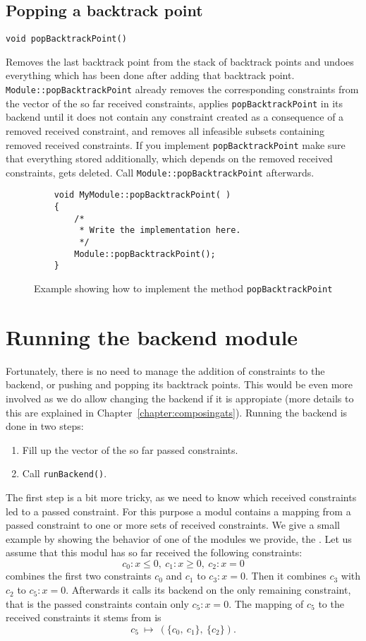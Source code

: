\subsection{Popping a backtrack point}
\begin{verbatim}void popBacktrackPoint()\end{verbatim}
Removes the last backtrack point from the stack of backtrack points and undoes everything
which has been done after adding that backtrack point. \newline\texttt{Module::popBacktrackPoint}
already removes the corresponding constraints from the vector of the so far received
constraints, applies \texttt{popBacktrackPoint} in its backend until it does not
contain any constraint created as a consequence of a removed received constraint, and
removes all infeasible subsets containing removed received constraints. If you implement
\texttt{popBacktrackPoint} make sure that everything stored additionally, which
depends on the removed received constraints, gets deleted. Call
\texttt{Module::popBacktrackPoint} afterwards.

\begin{figure}[htb]
\label{fig:exa_popBacktrackPoint}
\caption{Example showing how to implement the method \texttt{popBacktrackPoint}}
\begin{verbatim}
	void MyModule::popBacktrackPoint( )
	{
	    /*
	     * Write the implementation here.
	     */
	    Module::popBacktrackPoint();
	}
\end{verbatim}
\end{figure}

\section{Running the backend module}
\label{sec:runbackend}
Fortunately, there is no need to manage the addition of constraints to the backend, or pushing and
popping its backtrack points. This would be even more involved as we do allow changing the
backend if it is appropiate (more details to this are explained in Chapter~\ref{chapter:composingats}).
Running the backend is done in two steps:
\begin{enumerate}
	\item Fill up the vector of the so far passed constraints.
	\item Call \texttt{runBackend()}.
\end{enumerate}
The first step is a bit more tricky, as we need to know which received constraints led to a passed
constraint. For this purpose a modul contains a mapping from a passed constraint to one or more
sets of received constraints. We give a small example by showing the behavior of one of the modules
we provide, the \simplifierModuleClass. Let us assume that this modul has so far received the following
constraints:
$$c_0:x\leq0,\ c_1:x\geq 0,\ c_2:x=0$$
\simplifierModuleClass combines the first two constraints $c_0$ and $c_1$ to $c_3:x=0$. Then it combines
$c_3$ with $c_2$ to $c_5:x=0$. Afterwards it calls its backend on the only remaining constraint,
that is the passed constraints contain only $c_5:x=0$. The mapping of $c_5$ to the received constraints it
stems from is $$c_5\ \mapsto\ (\{c_0,\ c_1\},\ \{c_2\}).$$

